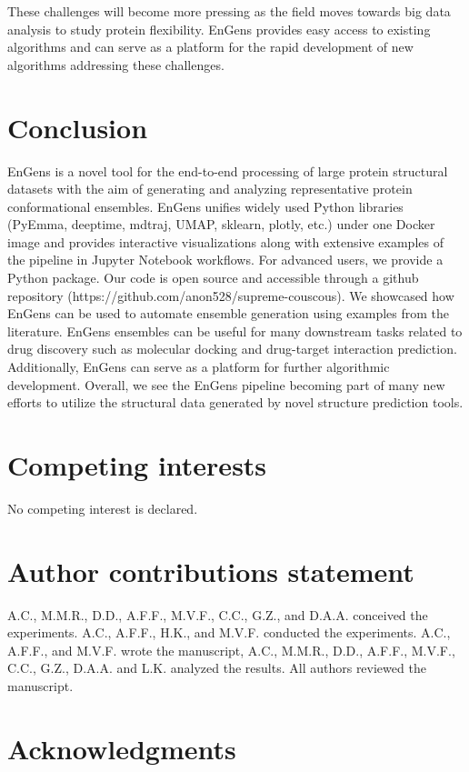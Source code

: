 \documentclass[numsec,webpdf,contemporary,large]{oup-authoring-template}
\theoremstyle{thmstyleone}%
\theoremstyle{thmstyletwo}%
\theoremstyle{thmstylethree}%
\begin{document}
These challenges will become more pressing as the field moves towards big data analysis to study protein flexibility. EnGens provides easy access to existing algorithms and can serve as a platform for the rapid development of new algorithms addressing these challenges.

\section{Conclusion}

EnGens is a novel tool for the end-to-end processing of large protein structural datasets with the aim of generating and analyzing representative protein conformational ensembles. EnGens unifies widely used Python libraries (PyEmma, deeptime, mdtraj, UMAP, sklearn, plotly, etc.) under one Docker image and provides interactive visualizations along with extensive examples of the pipeline in Jupyter Notebook workflows. For advanced users, we provide a Python package. Our code is open source and accessible through a github repository (https://github.com/anon528/supreme-couscous). We showcased how EnGens can be used to automate ensemble generation using examples from the literature.  EnGens ensembles can be useful for many downstream tasks related to drug discovery such as molecular docking and drug-target interaction prediction. Additionally, EnGens can serve as a platform for further algorithmic development. Overall, we see the EnGens pipeline becoming part of many new efforts to utilize the structural data generated by novel structure prediction tools. 


\section{Competing interests}
No competing interest is declared.

\section{Author contributions statement}
A.C., M.M.R., D.D., A.F.F., M.V.F., C.C., G.Z., and D.A.A. conceived the experiments. A.C., A.F.F., H.K., and M.V.F. conducted the experiments. A.C., A.F.F., and M.V.F. wrote the manuscript, A.C., M.M.R., D.D., A.F.F., M.V.F., C.C., G.Z., D.A.A. and L.K. analyzed the results. All authors reviewed the manuscript.

\section{Acknowledgments}
\end{document}
